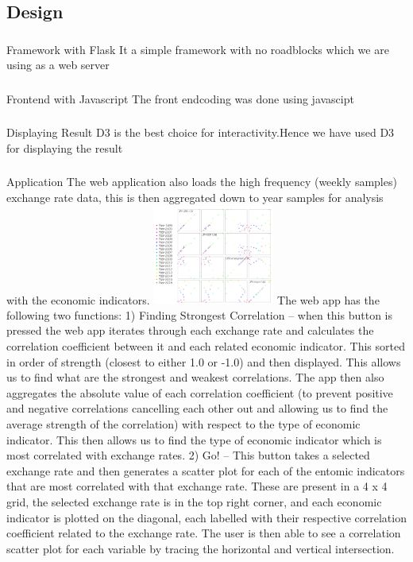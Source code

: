 \subsection{Design}
\subsubsection{}{Framework with Flask}
It a simple framework with no roadblocks which we are using as a web server
\subsubsection{}{Frontend with Javascript}
The front endcoding was done using javascipt
\subsubsection{}{Displaying Result}
D3 is the best choice for interactivity.Hence we have used D3 for displaying the result

\subsubsection{}{Application}
 The web application also loads the high frequency (weekly samples) exchange rate data, this is then aggregated down to year samples for analysis with the economic indicators.
 \newline
\includegraphics[width=0.30\textwidth]{web.jpg}
\newline
The web app has the following two functions:
1)	Finding Strongest Correlation – when this button is pressed the web app iterates through each exchange rate and calculates the correlation coefficient between it and each related economic indicator.  This sorted in order of strength (closest to either 1.0 or -1.0) and then displayed.  This allows us to find what are the strongest and weakest correlations. The app then also aggregates the absolute value of each correlation coefficient (to prevent positive and negative correlations cancelling each other out and allowing us to find the average strength of the correlation) with respect to the type of economic indicator.  This then allows us to find the type of economic indicator which is most correlated with exchange rates.
2)	Go! – This button takes a selected exchange rate and then generates a scatter plot for each of the entomic indicators that are most correlated with that exchange rate. These are present in a 4 x 4 grid, the selected exchange rate is in the top right corner, and each economic indicator is plotted on the diagonal, each labelled with their respective correlation coefficient related to the exchange rate.  The user is then able to see a correlation scatter plot for each variable by tracing the horizontal and vertical intersection.


